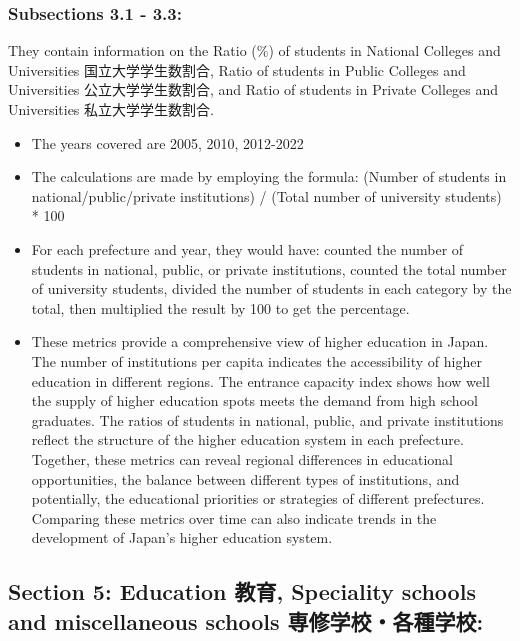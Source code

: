 \documentclass[
  12pt,
  letterpaper,
  DIV=11,
  numbers=noendperiod]{scrartcl}
\begin{document}
\hypertarget{subsections-3.1---3.3-1}{%
\subsubsection{Subsections 3.1 - 3.3:}\label{subsections-3.1---3.3-1}}

They contain information on the Ratio (\%) of students in National
Colleges and Universities 国立大学学生数割合, Ratio of students in
Public Colleges and Universities 公立大学学生数割合, and Ratio of
students in Private Colleges and Universities 私立大学学生数割合.

\begin{itemize}
\item
  The years covered are 2005, 2010, 2012-2022
\item
  The calculations are made by employing the formula: (Number of
  students in national/public/private institutions) / (Total number of
  university students) * 100
\item
  For each prefecture and year, they would have: counted the number of
  students in national, public, or private institutions, counted the
  total number of university students, divided the number of students in
  each category by the total, then multiplied the result by 100 to get
  the percentage.
\item
  These metrics provide a comprehensive view of higher education in
  Japan. The number of institutions per capita indicates the
  accessibility of higher education in different regions. The entrance
  capacity index shows how well the supply of higher education spots
  meets the demand from high school graduates. The ratios of students in
  national, public, and private institutions reflect the structure of
  the higher education system in each prefecture. Together, these
  metrics can reveal regional differences in educational opportunities,
  the balance between different types of institutions, and potentially,
  the educational priorities or strategies of different prefectures.
  Comparing these metrics over time can also indicate trends in the
  development of Japan's higher education system.
\end{itemize}

\hypertarget{section-5-education-ux6559ux80b2-speciality-schools-and-miscellaneous-schools-ux5c02ux4feeux5b66ux6821ux5404ux7a2eux5b66ux6821}{%
\subsection{Section 5: Education 教育, Speciality schools and
miscellaneous schools
専修学校・各種学校:}\label{section-5-education-ux6559ux80b2-speciality-schools-and-miscellaneous-schools-ux5c02ux4feeux5b66ux6821ux5404ux7a2eux5b66ux6821}}
\end{document}
